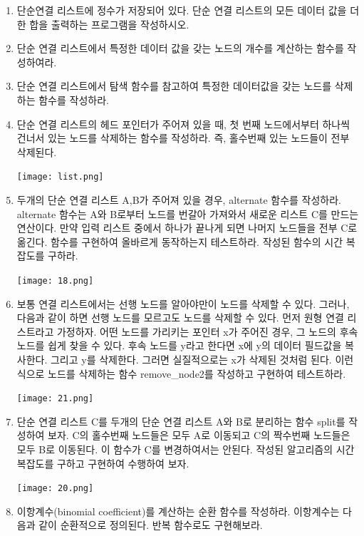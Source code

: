 \documentclass[11pt,a4paper]{article}
\begin{document}
\begin{enumerate}
\item 단순연결 리스트에 정수가 저장되어 있다. 단순 연결 리스트의 모든 데이터 값을 더한 합을 출력하는 프로그램을 작성하시오.

\item 단순 연결 리스트에서 특정한 데이터 값을 갖는 노드의 개수를 계산하는 함수를 작성하여라.

\item 단순 연결 리스트에서 탐색 함수를 참고하여 특정한 데이터값을 갖는 노드를 삭제하는 함수를 작성하라.

\item 단순 연결 리스트의 헤드 포인터가 주어져 있을 때, 첫 번째 노드에서부터 하나씩 건너서 있는 노드를 삭제하는 함수를 작성하라. 즉, 홀수번째 있는 노드들이 전부 삭제된다.

\texttt{[image: list.png]}

\item 두개의 단순 연결 리스트 A,B가 주어져 있을 경우, alternate 함수를 작성하라. alternate 함수는 A와 B로부터 노드를 번갈아 가져와서 새로운 리스트 C를 만드는 연산이다. 만약 입력 리스트 중에서 하나가 끝나게 되면 나머지 노드들을 전부 C로 옮긴다. 함수를 구현하여 올바르게 동작하는지 테스트하라. 작성된 함수의 시간 복잡도를 구하라.

\texttt{[image: 18.png]}

\item 보통 연결 리스트에서는 선행 노드를 알아야만이 노드를 삭제할 수 있다. 그러나, 다음과 같이 하면 선행 노드를 모르고도 노드를 삭제할 수 있다. 먼저 원형 연결 리스트라고 가정하자. 어떤 노드를 가리키는 포인터 x가 주어진 경우, 그 노드의 후속 노드를 쉽게 찾을 수 있다. 후속 노드를 y라고 한다면 x에 y의 데이터 필드값을 복사한다. 그리고 y를 삭제한다. 그러면 실질적으로는 x가 삭제된 것처럼 된다. 이런 식으로 노드를 삭제하는 함수 remove_node2를 작성하고 구현하여 테스트하라.

\texttt{[image: 21.png]}

\item 단순 연결 리스트 C를 두개의 단순 연결 리스트 A와 B로 분리하는 함수 split를 작성하여 보자. C의 홀수번째 노드들은 모두 A로 이동되고 C의 짝수번째 노드들은 모두 B로 이동된다. 이 함수가 C를 변경하여서는 안된다. 작성된 알고리즘의 시간 복잡도를 구하고 구현하여 수행하여 보자.

\texttt{[image: 20.png]}
\item 이항계수(binomial coefficient)를 계산하는 순환 함수를 작성하라. 이항계수는 다음과 같이 순환적으로 정의된다. 반복 함수로도 구현해보라.\\


\end{enumerate}
\end{document}
